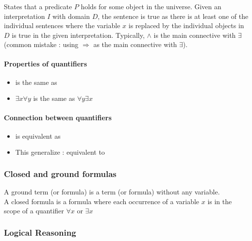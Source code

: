 States that a predicate $P$ holds for some object in the universe. Given an interpretation $I$ with domain $D$, the sentence is true as there is at least one of the individual sentences where the variable $x$ is replaced by the individual objects in $D$ is true in the given interpretation. Typically, $\land$ is the main connective with $\exists$ (common mistake : using $\Rightarrow$ as the main connective with $\exists$).

\paragraph{Properties of quantifiers}

\begin{itemize}
\item {} is the same as 
\item $\exists x \forall y$ is  the same as $\forall y \exists x$
\end{itemize}

\paragraph{Connection between quantifiers}

\begin{itemize}
\item {} is equivalent as 
\item This generalize :  equivalent to 
\end{itemize}

\subsubsection{Closed and ground formulas}

A ground term (or formula) is a term (or formula) without any variable.\\
A closed formula is a formula where each occurrence of a variable $x$ is in the scope of a quantifier $\forall x$ or $\exists x$

\subsubsection{Logical Reasoning}


